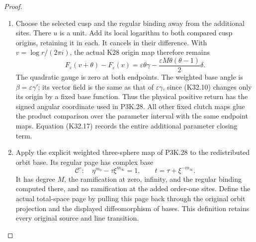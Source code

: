 \begin{proof}
\begin{enumerate}[label=\arabic*.]
\par\medskip\noindent\textbf{The physical parameter cochain and page.}
We now work on the sphere locus $D=\varepsilon=\pm1$.
The orders are coprime, so $M=m_\infty m_0$ is their
least common multiple and the parameter is
$\lambda=r^M$. The fixed elliptic and delta clutch
coefficients are independent of $r$. The gamma part
has the exact ordinary-to-cap scalar variation
$n_i(c-c_0)s_i\delta/m_i$, where
$c=\log\lambda/(2\pi i)$ and $s_i=\log q_i/(2\pi i)$.
For one positive $r$-loop put
\[
 k_\infty=m_0n_\infty,\quad
 k_0=m_\infty n_0,\quad k_j=Mn_j.
\]
In the zero-framing atlas the actual inverse closing
multiplier and its redistributed counterpart are
\[
 \begin{split}
 f_{\rm old}(t)
   &=t^{k_0}\prod_j(t-c_j)^{Mn_j}(t-t_c)^{-D},\\
 f_{\rm new}(t)&=t^{k_0}(t-t_c)^{-D},\qquad
 \frac{f_{\rm old}}{f_{\rm new}}=u(t)^M.                
 \end{split}\tag{K32.17}
\]
Their orders at all capped values, including infinity,
are exactly the marked integers. For the retained
framing include exponent $-Mb_0$ on its ordinary
chart. This gives the same identity with the $u$
of that extended atlas.

\item Choose the selected cusp and the regular binding away
from the additional sites. There $u$ is a unit.
Add its local logarithm to both compared cusp origins,
retaining it in each. It cancels in their difference.
With $v=\log r/(2\pi i)$, the actual K28 origin map
therefore remains
\[
 F_\varepsilon(v+\theta)-F_\varepsilon(v)
   =\varepsilon\theta\gamma
        -\frac{\varepsilon M\theta(\theta-1)}2\delta.
                                                               \tag{K32.18}
\]
The quadratic gauge is zero at both endpoints.
The weighted base angle is $\beta=\varepsilon\gamma'$;
its vector field is the same as that of
$\varepsilon\gamma$, since (K32.10) changes only its
origin by a fixed base function. Thus the physical
positive return has the signed angular coordinate
used in P3K.28. All other fixed clutch maps glue the
product comparison over the parameter interval with
the same endpoint maps. Equation (K32.17) records
the entire additional parameter closing term.

\item Apply the explicit weighted three-sphere map of
P3K.28 to the redistributed orbit base. Its regular
page has complex base
\[
 \mathcal C^\circ:\quad
 \eta^{m_0}-\tau\xi^{m_\infty}=1,\qquad
 t=\tau+\xi^{-m_\infty}.                              \tag{K32.19}
\]
It has degree $M$, the ramification at zero, infinity,
and the regular binding computed there, and no
ramification at the added order-one sites.
Define the actual total-space page by pulling this
page back through the original orbit projection and
the displayed diffeomorphism of bases. This definition
retains every original source and line transition.


\end{enumerate}
\end{proof}
